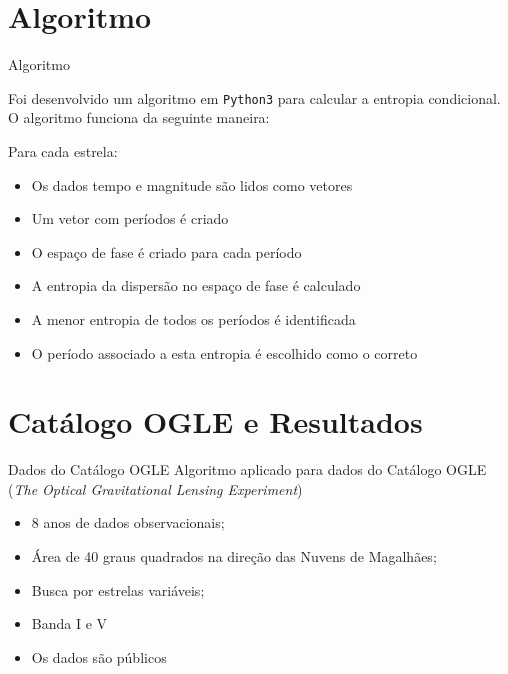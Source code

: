 \documentclass{beamer}
\begin{document}
\section{Algoritmo}

\begin{frame}{Algoritmo}

Foi desenvolvido um algoritmo em \texttt{Python3} para calcular a entropia condicional. O algoritmo funciona da seguinte maneira:

\vspace{.1cm}
\begin{block}{Para cada estrela:}
  \begin{itemize}
    \item Os dados tempo e magnitude são lidos como vetores
    \item Um vetor com períodos é criado
    \item O espaço de fase é criado para cada período
    \item A entropia da dispersão no espaço de fase é calculado
    \item A menor entropia de todos os períodos é identificada
    \item O período associado a esta entropia é escolhido como o correto
  \end{itemize}
\end{block}


\end{frame}


\section{Catálogo OGLE e Resultados}


\begin{frame}{Dados do Catálogo OGLE}
Algoritmo aplicado para dados do Catálogo OGLE (\textit{The Optical Gravitational Lensing Experiment}) \citep{Udalski2008}

\begin{itemize}
  \item 8 anos de dados observacionais;
  \item Área de 40 graus quadrados na direção das Nuvens de Magalhães;
  \item Busca por estrelas variáveis;
  \item Banda I e V
  \item Os dados são públicos
\end{itemize}

\end{frame}
\end{document}
